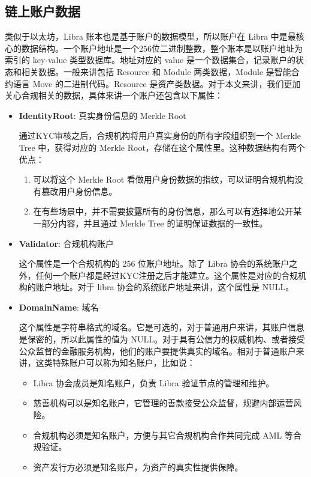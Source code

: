 \subsection{链上账户数据}
类似于以太坊，Libra 账本也是基于账户的数据模型，所以账户在 Libra 中是最核心的数据结构。一个账户地址是一个256位二进制整数，整个账本是以账户地址为索引的 key-value 类型数据库。地址对应的 value 是一个数据集合，记录账户的状态和相关数据。一般来讲包括 Resource 和 Module 两类数据，Module 是智能合约语言 Move 的二进制代码。Resource 是资产类数据。对于本文来讲，我们更加关心合规相关的数据，具体来讲一个账户还包含以下属性：

\begin{itemize}
    \item[\dag] \textbf{IdentityRoot}: 真实身份信息的 Merkle Root

    通过KYC审核之后，合规机构将用户真实身份的所有字段组织到一个 Merkle Tree 中，获得对应的 Merkle Root，存储在这个属性里。这种数据结构有两个优点：
    \begin{enumerate}
        \item 可以将这个 Merkle Root 看做用户身份数据的指纹，可以证明合规机构没有篡改用户身份信息。
        \item 在有些场景中，并不需要披露所有的身份信息，那么可以有选择地公开某一部分内容，并且通过 Merkle Tree 的证明保证数据的一致性。
    \end{enumerate}

    \item[\dag] \textbf{Validator}: 合规机构账户

    这个属性是一个合规机构的 256 位账户地址。除了 Libra 协会的系统账户之外，任何一个账户都是经过KYC注册之后才能建立。这个属性是对应的合规机构的账户地址。对于 libra 协会的系统账户地址来讲，这个属性是 NULL。

    \item[\dag] \textbf{DomainName}: 域名

    这个属性是字符串格式的域名。它是可选的，对于普通用户来讲，其账户信息是保密的，所以此属性的值为 NULL。对于具有公信力的权威机构、或者接受公众监督的金融服务机构，他们的账户要提供真实的域名。相对于普通账户来讲，这类特殊账户可以称为知名账户，比如说：

    \begin{itemize}
        \item Libra 协会成员是知名账户，负责 Libra 验证节点的管理和维护。
        \item 慈善机构可以是知名账户，它管理的善款接受公众监督，规避内部运营风险。
        \item 合规机构必须是知名账户，方便与其它合规机构合作共同完成 AML 等合规验证。
        \item 资产发行方必须是知名账户，为资产的真实性提供保障。
    \end{itemize}
\end{itemize}

